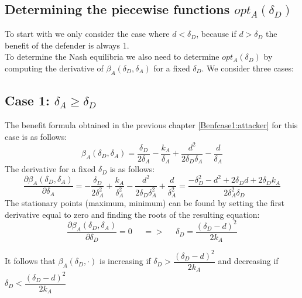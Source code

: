 %
%
\subsection{Determining the piecewise functions $opt_{A}(\delta_{D})$}
To start with we only consider the case where $d < \delta_{D}$, because if $d > \delta_{D}$ the benefit of the defender  is always 1. \\
To determine the Nash equilibria we also need to determine $opt_{A}(\delta_{D})$ by computing the derivative of $\beta_{A}(\delta_{D},\delta_{A})$ for a fixed $\delta_{D}$. We consider three cases: \\

\subsection*{Case 1: $\delta_{A} \geq \delta_{D}$}

The benefit formula obtained in the previous chapter \ref{Benfcase1:attacker} for this case is as follows:
\begin{equation*}
\beta_{A}(\delta_{D},\delta_{A}) =\dfrac{\delta_{D}}{2\delta_{A}} - \dfrac{k_{A}}{\delta_{A}} + \dfrac{d^{2}}{2\delta_{D}\delta_{A}} - \dfrac{d}{\delta_{A}}
\end{equation*}
The derivative for a fixed $\delta_{D}$ is as follows:
\begin{equation*}
\dfrac{\partial \beta_{A}(\delta_{D},\delta_{A})}{\partial \delta_{A}} = -\dfrac{\delta_{D}}{2\delta_{A}^{2}} + \dfrac{k_{A}}{\delta_{A}^{2}} - \dfrac{d^{2}}{2\delta_{D}\delta_{A}^{2}} + \dfrac{d}{\delta_{A}^{2}} = \dfrac{-\delta_{D}^{2} - d^{2} + 2\delta_{D}d + 2\delta_{D}k_{A}}{2\delta_{A}^{2}\delta_{D}}
\end{equation*}
The stationary points (maximum, minimum) can be found by setting the first derivative equal to zero and finding the roots of the resulting equation:
\begin{equation*}
\frac{\partial \beta_{A}(\delta_{D},\delta_{A})}{\partial \delta_{D}} =0 ~~~~~~ =>~~~~~~  \delta_{D}= \dfrac{(\delta_{D}-d)^{2}}{2k_{A}}
\end{equation*}

It follows that $\beta_{A}(\delta_{D},\cdot)$ is increasing if $\delta_{D}> \dfrac{(\delta_{D}-d)^{2}}{2k_{A}}$ and decreasing if $\delta_{D} < \dfrac{(\delta_{D}-d)^{2}}{2k_{A}}$  \\

